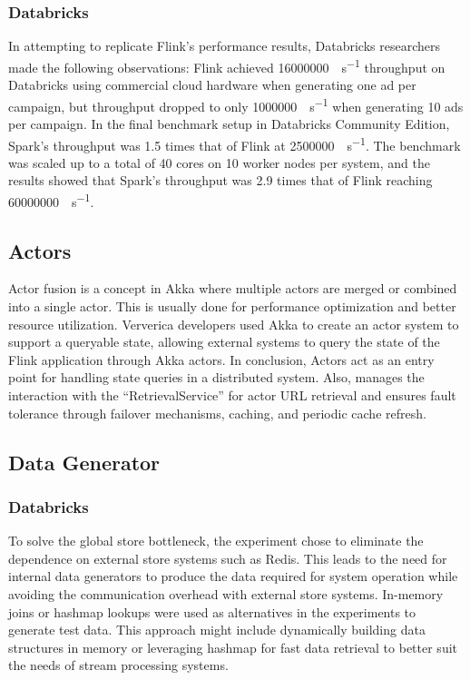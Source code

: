 \documentclass[runningheads]{llncs}
\begin{document}
\subsubsection{Databricks}
%
In attempting to replicate Flink's performance results, Databricks researchers made the following observations: 
Flink achieved \SI{16000000}{\tuple\per\second} throughput on Databricks using commercial cloud hardware when generating
one ad per campaign, but throughput dropped to only \SI{1000000}{\tuple\per\second}
when generating \num{10} ads per campaign. In the final benchmark setup in Databricks Community Edition, Spark's throughput
was 1.5 times that of Flink at \SI{2500000}{\tuple\per\second}. The benchmark was scaled up to a total of \num{40} cores on 
\num{10} worker nodes per system, and the results showed that Spark's throughput was 2.9 times
that of Flink reaching \SI{60000000}{\tuple\per\second}.

\subsection{Actors}
Actor fusion is a concept in Akka where multiple actors are merged or combined into a single actor. 
This is usually done for performance optimization and better resource utilization. Ververica developers 
used Akka to create an actor system to support a queryable state, allowing external systems to query 
the state of the Flink application through Akka actors. In conclusion, Actors act as an entry point for 
handling state queries in a distributed system. Also, manages the interaction with the “RetrievalService” for 
actor URL retrieval and ensures fault tolerance through failover mechanisms, caching, and periodic cache refresh.

\subsection{Data Generator}
\subsubsection{Databricks}

To solve the global store bottleneck, the experiment chose to eliminate the dependence on external store systems
such as Redis. This leads to the need for internal data generators to produce the data required for system operation
while avoiding the communication overhead with external store systems. In-memory joins or hashmap lookups were 
used as alternatives in the experiments to generate test data. This approach might include dynamically building 
data structures in memory or leveraging hashmap for fast data retrieval to better suit the needs of 
stream processing systems.
\end{document}
